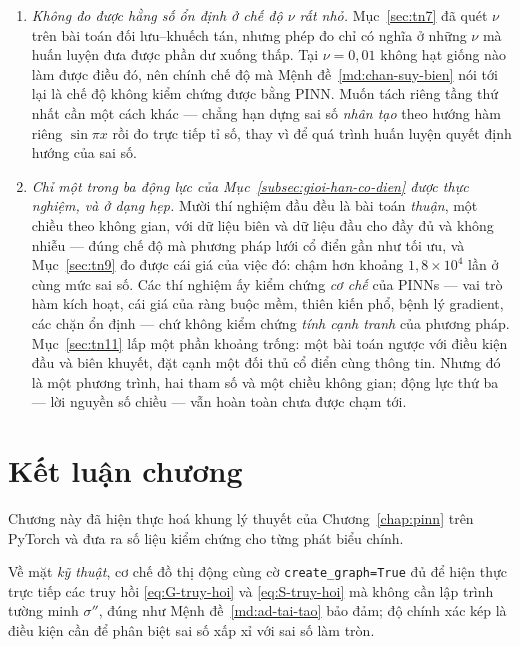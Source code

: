 \begin{enumerate}[label=(\arabic*),leftmargin=2.2em,itemsep=4pt]
\item \emph{Không đo được hằng số ổn định ở chế độ $\nu$ rất nhỏ.}
Mục~\ref{sec:tn7} đã quét $\nu$ trên bài toán đối lưu--khuếch tán, nhưng phép đo
chỉ có nghĩa ở những $\nu$ mà huấn luyện đưa được phần dư xuống thấp. Tại
$\nu = 0{,}01$ không hạt giống nào làm được điều đó, nên chính chế độ mà
Mệnh đề~\ref{md:chan-suy-bien} nói tới lại là chế độ không kiểm chứng được bằng
PINN. Muốn tách riêng tầng thứ nhất cần một cách khác --- chẳng hạn dựng sai số
\emph{nhân tạo} theo hướng hàm riêng $\sin\pi x$ rồi đo trực tiếp tỉ số, thay vì
để quá trình huấn luyện quyết định hướng của sai số.

\item \emph{Chỉ một trong ba động lực của Mục~\ref{subsec:gioi-han-co-dien}
được thực nghiệm, và ở dạng hẹp.} Mười thí nghiệm đầu đều là bài toán
\emph{thuận}, một chiều theo không gian, với dữ liệu biên và dữ liệu đầu cho
đầy đủ và không nhiễu --- đúng chế độ mà phương pháp lưới cổ điển gần như tối
ưu, và Mục~\ref{sec:tn9} đo được cái giá của việc đó: chậm hơn khoảng
$1{,}8\times10^{4}$ lần ở cùng mức sai số. Các thí nghiệm ấy kiểm chứng \emph{cơ
chế} của PINNs --- vai trò hàm kích hoạt, cái giá của ràng buộc mềm, thiên kiến
phổ, bệnh lý gradient, các chặn ổn định --- chứ không kiểm chứng \emph{tính cạnh
tranh} của phương pháp. Mục~\ref{sec:tn11} lấp một phần khoảng trống: một bài
toán ngược với điều kiện đầu và biên khuyết, đặt cạnh một đối thủ cổ điển cùng
thông tin. Nhưng đó là một phương trình, hai tham số và một chiều không gian;
động lực thứ ba --- lời nguyền số chiều --- vẫn hoàn toàn chưa được chạm tới.
\end{enumerate}
 
\section*{Kết luận chương}
 
Chương này đã hiện thực hoá khung lý thuyết của Chương~\ref{chap:pinn} trên
PyTorch và đưa ra số liệu kiểm chứng cho từng phát biểu chính.
 
Về mặt \emph{kỹ thuật}, cơ chế đồ thị động cùng cờ \texttt{create\_graph=True} đủ
để hiện thực trực tiếp các truy hồi \eqref{eq:G-truy-hoi} và
\eqref{eq:S-truy-hoi} mà không cần lập trình tường minh $\sigma''$, đúng như
Mệnh đề~\ref{md:ad-tai-tao} bảo đảm; độ chính xác kép là điều kiện cần để phân
biệt sai số xấp xỉ với sai số làm tròn.
 
